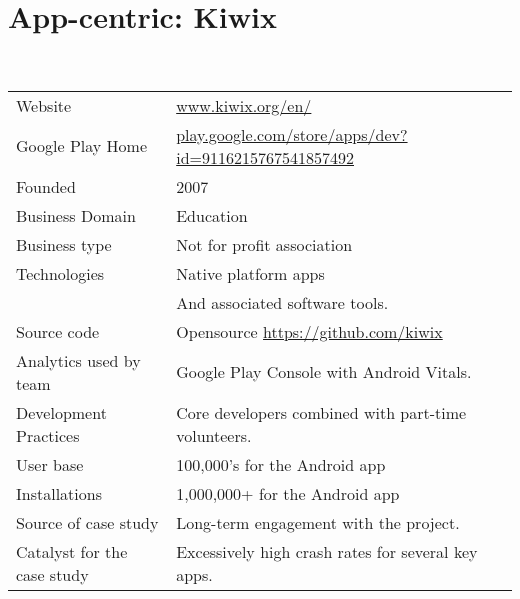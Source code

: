 




\clearpage


\section{App-centric: Kiwix}~\label{case-study-overview-kiwix}

{\renewcommand{\arraystretch}{0.8}%
\begin{table*}
    \centering
    \small
    \begin{tabular}{lp{9cm}}
       \toprule
       Website &\href{https://www.kiwix.org/en/}{www.kiwix.org/en/}  \\
       Google Play Home & \href{https://play.google.com/store/apps/dev?id=9116215767541857492}{play.google.com/store/apps/dev?id=9116215767541857492} \\
       Founded & 2007 \\
       Business Domain & Education \\
       Business type & Not for profit association \\
       Technologies  & Native platform apps \\
       & And associated software tools. \\
       Source code  & Opensource \url{https://github.com/kiwix} \\
       Analytics used by team & Google Play Console with Android Vitals. \\
       Development Practices & Core developers combined with part-time volunteers. \\
       \midrule
       User base & 100,000's for the Android app \\
       Installations & 1,000,000+ for the Android app \\
       \midrule       
       Source of case study &Long-term engagement with the project. \\
       Catalyst for the case study &Excessively high crash rates for several key apps. \\

\end{tabular}
\end{table*}}
